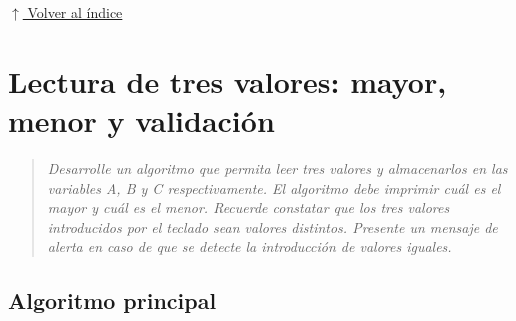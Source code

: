 \documentclass[12pt]{article}
\newcommand{\pseudocodigo}[2]{%
}
\newcommand{\volverindice}{%
    \vspace{1em}%
    \begin{flushright}%
        \hyperlink{indice}{\small $\uparrow$ Volver al índice}%
    \end{flushright}%
}
\newcommand{\enunciado}[1]{%
    \begin{quote}
        \itshape #1
    \end{quote}
}
\begin{document}






\volverindice
\newpage


\section{Lectura de tres valores: mayor, menor y validación}

\enunciado{Desarrolle un algoritmo que permita leer tres valores y almacenarlos en las variables A, B y C respectivamente. El algoritmo debe imprimir cuál es el mayor y cuál es el menor. Recuerde constatar que los tres valores introducidos por el teclado sean valores distintos. Presente un mensaje de alerta en caso de que se detecte la introducción de valores iguales.}

\subsection{Algoritmo principal}

\pseudocodigo{ej02_mayor_menor_tres}{Mayor y menor de tres valores con validación}


\end{document}
